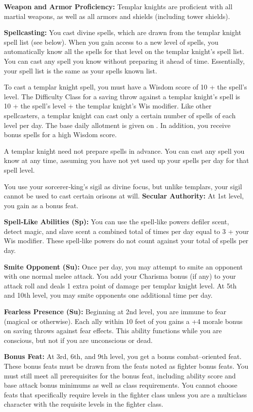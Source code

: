 {
\textbf{Weapon and Armor Proficiency:} Templar knights are proficient with all martial weapons, as well as all armors and shields (including tower shields).

\textbf{Spellcasting:} You cast divine spells, which are drawn from the templar knight spell list (see below). When you gain access to a new level of spells, you automatically know all the spells for that level on the templar knight's spell list. You can cast any spell you know without preparing it ahead of time. Essentially, your spell list is the same as your spells known list.

To cast a templar knight spell, you must have a Wisdom score of 10 + the spell's level. The Difficulty Class for a saving throw against a templar knight's spell is 10 + the spell's level + the templar knight's Wis modifier. Like other spellcasters, a templar knight can cast only a certain number of spells of each level per day. The base daily allotment is given on . In addition, you receive bonus spells for a high Wisdom score.

A templar knight need not prepare spells in advance. You can cast any spell you know at any time, assuming you have not yet used up your spells per day for that spell level.

You use your sorcerer‐king's sigil as divine focus, but unlike templars, your sigil cannot be used to cast certain orisons at will.
\textbf{Secular Authority:} At 1st level, you gain  as a bonus feat.

\textbf{Spell‐Like Abilities (Sp):} You can use the spell‐like powers defiler scent, detect magic, and slave scent a combined total of times per day equal to 3 + your Wis modifier. These spell‐like powers do not count against your total of spells per day.

\textbf{Smite Opponent (Su):} Once per day, you may attempt to smite an opponent with one normal melee attack. You add your Charisma bonus (if any) to your attack roll and deals 1 extra point of damage per templar knight level. At 5th and 10th level, you may smite opponents one additional time per day.

\textbf{Fearless Presence (Su):} Beginning at 2nd level, you are immune to fear (magical or otherwise). Each ally within 10 feet of you gains a +4 morale bonus on saving throws against fear effects. This ability functions while you are conscious, but not if you are unconscious or dead.

\textbf{Bonus Feat:} At 3rd, 6th, and 9th level, you get a bonus combat–oriented feat. These bonus feats must be drawn from the feats noted as fighter bonus feats. You must still meet all prerequisites for the bonus feat, including ability score and base attack bonus minimums as well as class requirements. You cannot choose feats that specifically require levels in the fighter class unless you are a multiclass character with the requisite levels in the fighter class.

}
